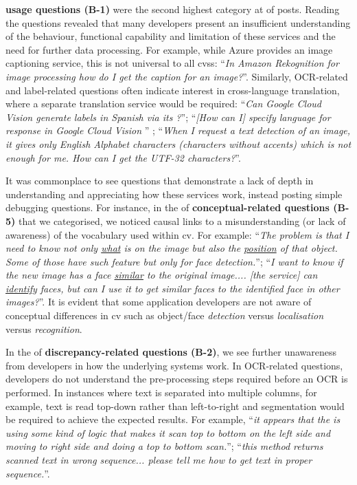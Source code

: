 %
\textbf{ usage questions (B-1)} were the second highest category at \PctTaxBAPIUsage{} of posts. Reading the questions revealed that many developers present an insufficient understanding of the behaviour, functional capability and limitation of these services and the need for further data processing. For example, while Azure provides an image captioning service, this is not universal to all \glspl{cvs}: ``\textit{In Amazon Rekognition for image processing how do I get the caption for an image?}''. Similarly, OCR-related and label-related questions often indicate interest in cross-language translation, where a separate translation service would be required: ``\textit{Can Google Cloud Vision generate labels in Spanish via its ?}''; ``\textit{[How can I] specify language for response in Google Cloud Vision }'' ; ``\textit{When I request a text detection of an image, it gives only English Alphabet characters (characters without accents) which is not enough for me. How can I get the UTF-32 characters?}''.

%
It was commonplace to see questions that demonstrate a lack of depth in understanding and appreciating how these services work, instead posting simple debugging questions. For instance, in the \PctTaxBConceptual{} of \textbf{conceptual-related questions (B-5)} that we categorised, we noticed causal links to a misunderstanding (or lack of awareness) of the vocabulary used within \gls{cv}. For example: ``\textit{The problem is that I need to know not only \uline{what} is on the image but also the \uline{position} of that object. Some of those  have such feature but only for face detection.}''; ``\textit{I want to know if the new image has a face \uline{similar} to the original image.... [the service] can \uline{identify} faces, but can I use it to get similar faces to the identified face in other images?}''. It is evident that some application developers are not aware of conceptual differences in \gls{cv} such as object/face \textit{detection} versus \textit{localisation} versus \textit{recognition}.

%
In the \PctTaxBDiscrepancy{} of \textbf{discrepancy-related questions (B-2)}, we see further unawareness from developers in how the underlying systems work. In OCR-related questions, developers do not understand the pre-processing steps required before an OCR is performed. In instances where text is separated into multiple columns, for example, text is read top-down rather than left-to-right and segmentation would be required to achieve the expected results. For example, ``\textit{it appears that the  is using some kind of logic that makes it scan top to bottom on the left side and moving to right side and doing a top to bottom scan.}''; ``\textit{this method returns scanned text in wrong sequence... please tell me how to get text in proper sequence.}''.


